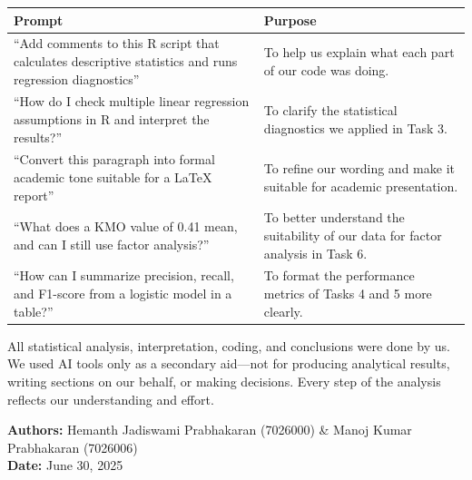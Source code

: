 \begin{center}
	\begin{tabular}{|p{6cm}|p{8.5cm}|}
		\hline
		\textbf{Prompt} & \textbf{Purpose} \\
		\hline
		``Add comments to this R script that calculates descriptive statistics and runs regression diagnostics'' & To help us explain what each part of our code was doing. \\
		\hline
		``How do I check multiple linear regression assumptions in R and interpret the results?'' & To clarify the statistical diagnostics we applied in Task 3. \\
		\hline
		``Convert this paragraph into formal academic tone suitable for a LaTeX report'' & To refine our wording and make it suitable for academic presentation. \\
		\hline
		``What does a KMO value of 0.41 mean, and can I still use factor analysis?'' & To better understand the suitability of our data for factor analysis in Task 6. \\
		\hline
		``How can I summarize precision, recall, and F1-score from a logistic model in a table?'' & To format the performance metrics of Tasks 4 and 5 more clearly. \\
		\hline
	\end{tabular}
\end{center}

All statistical analysis, interpretation, coding, and conclusions were done by us. We used AI tools only as a secondary aid—not for producing analytical results, writing sections on our behalf, or making decisions. Every step of the analysis reflects our understanding and effort.

\vspace{1em}
\noindent\textbf{Authors:} Hemanth Jadiswami Prabhakaran (7026000) \& Manoj Kumar Prabhakaran (7026006) \\
\textbf{Date:} June 30, 2025